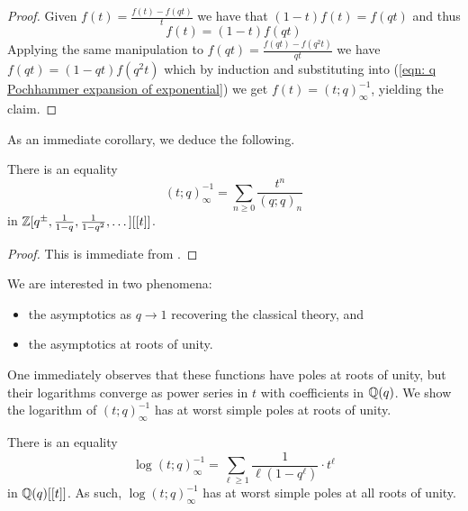 \begin{proof}
    Given $f(t)=\frac{f(t)-f(qt)}{t}$ we have that $(1-t)f(t)=f(qt)$ and thus 
    \begin{equation}\label{eqn: q Pochhammer expansion of exponential}
        f(t) = (1-t)f(qt)
    \end{equation} Applying the same manipulation to $f(qt)=\frac{f(qt)-f(q^{2}t)}{qt}$ we have $f(qt)=(1-qt)f(q^{2}t)$ which by induction and substituting into (\ref{eqn: q Pochhammer expansion of exponential}) we get $f(t)=(t;q)_{\infty}^{-1}$, yielding the claim. 
\end{proof}
As an immediate corollary, we deduce the following. 
\begin{corollary}
    There is an equality
    $$(t;q)_{\infty}^{-1}=\sum_{n\geq0}\frac{t^{n}}{(q;q)_{n}}$$
    in $\mathbb{Z}[q^{\pm},\frac{1}{1-q},\frac{1}{1-q^{2}}, \dots][[t]]$.
\end{corollary}
\begin{proof}
    This is immediate from .
\end{proof}
We are interested in two phenomena:
\begin{itemize}
    \item the asymptotics as $q\to 1$ recovering the classical theory, and 
    \item the asymptotics at roots of unity. 
\end{itemize}
One immediately observes that these functions have poles at roots of unity, but their logarithms converge as power series in $t$ with coefficients in $\mathbb{Q}(q)$. We show the logarithm of $(t;q)_{\infty}^{-1}$ has at worst simple poles at roots of unity. 
\begin{proposition}\label{prop: logarithm at worst simple poles at roots of unity}
    There is an equality 
    \begin{equation}\label{eqn: expresssion of logarithm of q exponential}
        \log(t;q)_{\infty}^{-1}=\sum_{\ell\geq1}\frac{1}{\ell(1-q^{\ell})}\cdot t^{\ell}
    \end{equation}
    in $\mathbb{Q}(q)[[t]]$. As such, $\log(t;q)_{\infty}^{-1}$ has at worst simple poles at all roots of unity. 
\end{proposition}
